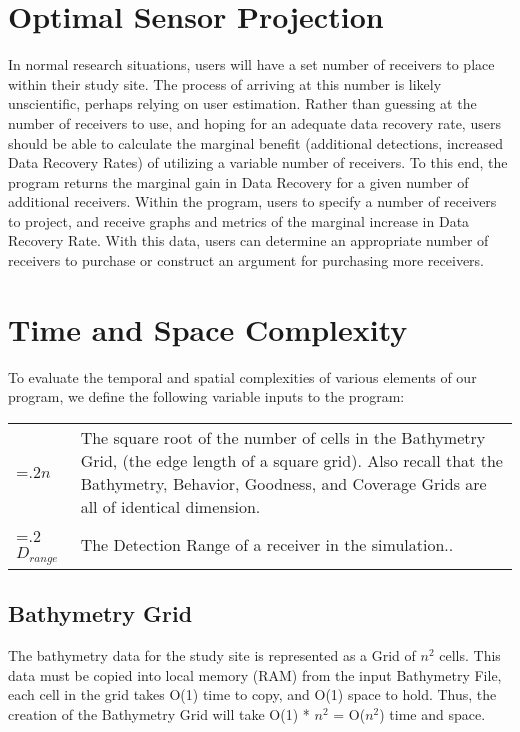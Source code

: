 \section{Optimal Sensor Projection}
In normal research situations, users will have a set number of receivers to place within their study site.  The process of arriving at this number is likely unscientific, perhaps relying on user estimation.  Rather than guessing at the number of receivers to use, and hoping for an adequate data recovery rate, users should be able to calculate the marginal benefit (additional detections, increased Data Recovery Rates) of utilizing a variable number of receivers.   To this end, the program returns the marginal gain in Data Recovery for a given number of additional receivers.  Within the program, users to specify a number of receivers to project, and receive graphs and metrics of the marginal increase in Data Recovery Rate.  With this data, users can determine an appropriate number of receivers to purchase or construct an argument for purchasing more receivers.


\section{Time and Space Complexity}
\label{computationalComplexity}
To evaluate the temporal and spatial complexities of various elements of our program, we define the following variable inputs to the program:\newline

\noindent\begin{tabularx}{\linewidth}{@{}>{\hsize=.2\hsize}X>{\hsize=1.5\hsize}X@{}}
	$n$ & The square root of the number of cells in the Bathymetry Grid, (the edge length of a square grid).  Also recall that the Bathymetry, Behavior, Goodness, and Coverage Grids are all of identical dimension.\newline\\
	 
	 $D_{range}$ & The Detection Range of a receiver in the simulation..\newline\\
\end{tabularx}



\subsection{Bathymetry Grid}
The bathymetry data for the study site is represented as a Grid of $n^2$ cells.  This data must be copied into local memory (RAM) from the input Bathymetry File, each cell in the grid takes O(1) time to copy, and O(1) space to hold.  Thus, the creation of the Bathymetry Grid will take O(1) * $n^2$ = O($n^2$) time and space.

